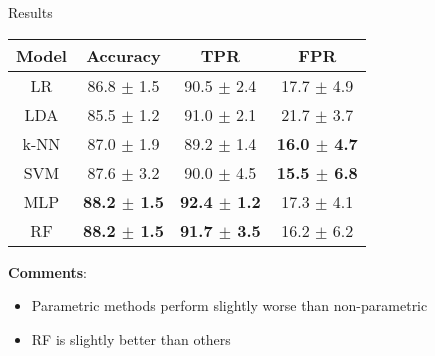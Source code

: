 \begin{frame}{Results}
\begin{table}[ht]
\small
\begin{center}
\begin{tabular}{c c c c }
\toprule
  Model     & Accuracy & TPR & FPR \\
\midrule
LR   &  86.8 $\pm$ 1.5 & 90.5  $\pm$  2.4 &  17.7  $\pm$  4.9 \\
LDA   &  85.5  $\pm$  1.2  & 91.0  $\pm$  2.1 &  21.7  $\pm$  3.7 \\
k-NN  &    87.0  $\pm$  1.9 & 89.2  $\pm$  1.4  & \textbf{16.0  $\pm$  4.7} \\
SVM  &   87.6  $\pm$  3.2 & 90.0  $\pm$  4.5 & \textbf{15.5  $\pm$  6.8} \\
MLP  &\textbf{88.2  $\pm$  1.5} & \textbf{92.4  $\pm$  1.2} & 17.3  $\pm$  4.1 \\
RF  & \textbf{88.2  $\pm$  1.5} & \textbf{91.7 $\pm$ 3.5} & 16.2  $\pm$  6.2 \\
\bottomrule
\end{tabular}
\end{center}
\end{table}

\begin{minipage}[t]{0.7\linewidth}
\textbf{Comments}:
    \begin{itemize}
        \item Parametric methods perform slightly worse than non-parametric
        \item RF is slightly better than others
    \end{itemize}
\end{minipage}

\end{frame}